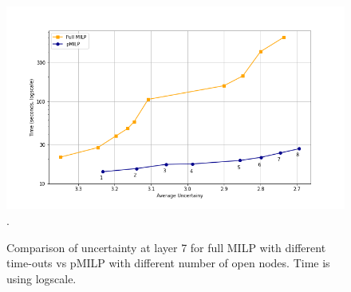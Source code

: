 \begin{figure}[h!]\hspace*{-0.8cm}
	\includegraphics[scale=0.6]{Layer7_comparison.png}.
	\caption{Comparison of uncertainty at layer 7 for full MILP with different time-outs vs pMILP with different number of open nodes. Time is using logscale.}
	\label{fig4}
\end{figure}



